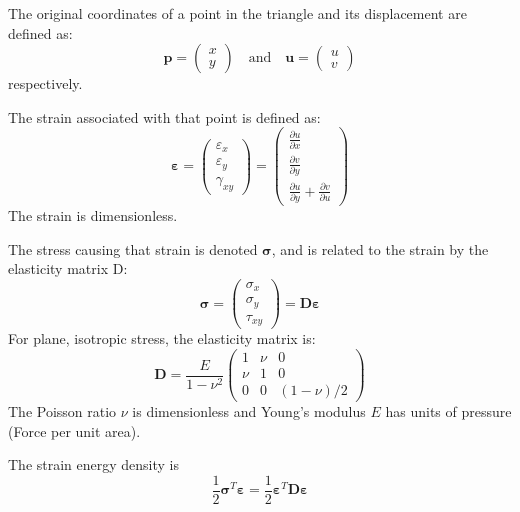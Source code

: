 \documentclass{article}
\renewcommand{\vec}[1]{\mathbf{#1}}
\renewcommand{\epsilon}{\varepsilon}
\begin{document}
The original coordinates of a point in the triangle and its
displacement are defined as:
\begin{displaymath}
  \vec{p}= \begin{pmatrix}
    x \\
    y
  \end{pmatrix}
\quad\mbox{and}\quad
\vec{u}= \begin{pmatrix} 
  u \\
  v
\end{pmatrix}
\end{displaymath}
respectively.

The strain associated with that point is defined as:
\begin{displaymath}
  \vec{\epsilon} =
  \begin{pmatrix}
    \epsilon_x \\ \epsilon_y \\ \gamma_{xy}
  \end{pmatrix}
  = 
  \begin{pmatrix}
    \frac{\partial u}{\partial x} \\
    \frac{\partial v}{\partial y} \\
    \frac{\partial u}{\partial y} +
    \frac{\partial v}{\partial u} 
  \end{pmatrix}
\end{displaymath}
The strain is dimensionless.

The stress causing that strain is denoted $\vec{\sigma}$, and is
related to the strain by the elasticity matrix D:
\begin{displaymath}
  \vec{\sigma} =
  \begin{pmatrix}
    \sigma_x \\ \sigma_y \\ \tau_{xy}
  \end{pmatrix}
  = 
  \vec{D}\vec{\epsilon}
\end{displaymath}
For plane, isotropic stress, the elasticity matrix is:
\begin{displaymath}
  \vec{D} = \frac{E}{1-\nu^2}
  \begin{pmatrix}
    1 & \nu & 0 \\
    \nu & 1 & 0 \\
    0   & 0 & (1-\nu)/2
  \end{pmatrix}
\end{displaymath}
The Poisson ratio $\nu$ is dimensionless and Young's modulus $E$ has
units of pressure (Force per unit area).

The strain energy density is
\begin{displaymath}
  \frac{1}{2}\vec{\sigma}^T\vec{\epsilon} = 
  \frac{1}{2}\vec{\epsilon}^T\vec{D}\vec{\epsilon}
\end{displaymath}
\end{document}
